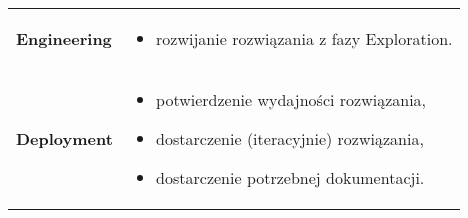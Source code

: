 \documentclass[../main.tex]{subfiles}
\begin{document}
\begin{table}[H]
\begin{center}
\begin{tabular}{ p{} p{} }
                \textbf{Engineering}
                &
                \begin{itemize}
                    \item rozwijanie rozwiązania z fazy Exploration.
                \end{itemize}
                \\

                \textbf{Deployment}
                &
                \begin{itemize}
                    \item potwierdzenie wydajności rozwiązania,
                    \item dostarczenie (iteracyjnie) rozwiązania,
                    \item dostarczenie potrzebnej dokumentacji.
                \end{itemize}
                \\
            \end{tabular}
        \end{center}
    \end{table}
\end{document}
